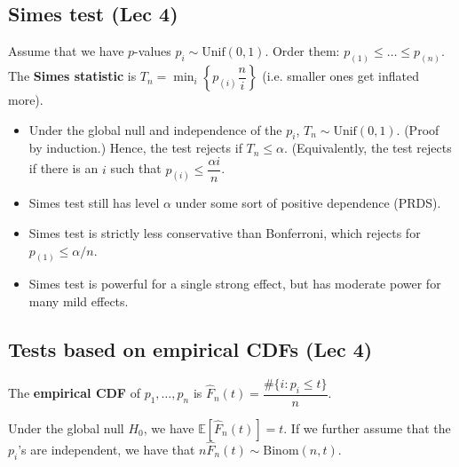 \documentclass[twoside]{article}
\newcommand\bbE{\mathbb{E}}
\begin{document}
\subsection{Simes test (Lec 4)}
Assume that we have $p$-values $p_i \sim \text{Unif}(0,1)$. Order them: $p_{(1)} \leq \dots \leq p_{(n)}$. The \textbf{Simes statistic} is $T_n = \min_i \left\{p_{(i)}\dfrac{n}{i} \right\}$ (i.e. smaller ones get inflated more).
\begin{itemize}
\item Under the global null and independence of the $p_i$, $T_n \sim \text{Unif}(0,1)$. (Proof by induction.) Hence, the test rejects if $T_n \leq \alpha$. (Equivalently, the test rejects if there is an $i$ such that $p_{(i)} \leq \dfrac{\alpha i}{n}$.

\item Simes test still has level $\alpha$ under some sort of positive dependence (PRDS).

\item Simes test is strictly less conservative than Bonferroni, which rejects for $p_{(1)} \leq \alpha / n$.

\item Simes test is powerful for a single strong effect, but has moderate power for many mild effects.
\end{itemize}

\subsection{Tests based on empirical CDFs (Lec 4)}
The \textbf{empirical CDF} of $p_1, \dots, p_n$ is $\widehat{F}_n(t) = \dfrac{\# \{ i: p_i \leq t \}}{n}$.

Under the global null $H_0$, we have $\bbE [\widehat{F}_n(t)] = t$. If we further assume that the $p_i$'s are independent, we have that $n\widehat{F}_n(t) \sim \text{Binom}(n, t)$.
\end{document}
